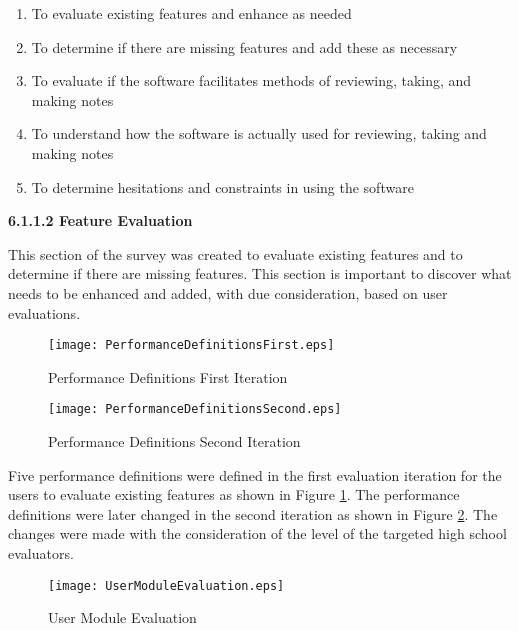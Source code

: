 \begin{enumerate}
\item To evaluate existing features and enhance as needed
\item To determine if there are missing features and add these as necessary
\item To evaluate if the software facilitates methods of reviewing, taking, and making notes
\item To understand how the software is actually used for reviewing, taking and making notes
\item To determine hesitations and constraints in using the software
\end{enumerate}

\begin{flushleft}
\textbf{6.1.1.2 Feature Evaluation}
\end{flushleft}

\begin{raggedright}
This section of the survey was created to evaluate existing features and to determine if there are missing features. This section is important to discover what needs to be enhanced and added, with due consideration, based on user evaluations.
\end{raggedright}

\begin{figure}[htbp!]
   \centering
   \texttt{[image: PerformanceDefinitionsFirst.eps]} 
   \caption{Performance Definitions First Iteration}
   \label{fig:performancedefinitionfirst}
\end{figure}

\begin{figure}[htbp!]
   \centering
   \texttt{[image: PerformanceDefinitionsSecond.eps]} 
   \caption{Performance Definitions Second Iteration}
   \label{fig:performancedefinitionsecond}
\end{figure}

\pagebreak

Five performance definitions were defined in the first evaluation iteration for the users to evaluate existing features as shown in Figure \ref{fig:performancedefinitionfirst}. The performance definitions were later changed in the second iteration as shown in Figure \ref{fig:performancedefinitionsecond}. The changes were made with the consideration of the level of the targeted high school evaluators.

\begin{figure}[htbp!]
   \centering
   \texttt{[image: UserModuleEvaluation.eps]} 
   \caption{User Module Evaluation}
   \label{fig:usermoduleevaluation}
\end{figure}

